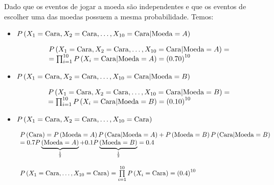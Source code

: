 \item

Dado que os eventos de jogar a moeda são independentes e que os eventos de
escolher uma das moedas possuem a mesma probabilidade. Temos:

\begin{itemize}

  \item $P\left( {{X_1} = {\rm{Cara}},{X_2} = {\rm{Cara}}, \ldots ,{X_{10}} = {\rm{Cara}}|{\rm{Moeda}} = A} \right)$

  \[\begin{array}{l}
  P\left( {{X_1} = {\rm{Cara}},{X_2} = {\rm{Cara}}, \ldots ,{X_{10}} = {\rm{Cara}}|{\rm{Moeda}} = A} \right) = \\
   = \prod\nolimits_{i = 1}^{10} {P\left( {{X_i} = {\rm{Cara}}|{\rm{Moeda}} = A} \right)}  = {\left( {0.70} \right)^{10}}
  \end{array}\]

  \item $P\left( {{X_1} = {\rm{Cara}},{X_2} = {\rm{Cara}}, \ldots ,{X_{10}} = {\rm{Cara}}|{\rm{Moeda}} = B} \right)$

  \[\begin{array}{l}
  P\left( {{X_1} = {\rm{Cara}},{X_2} = {\rm{Cara}}, \ldots ,{X_{10}} = {\rm{Cara}}|{\rm{Moeda}} = B} \right) = \\
   = \prod\nolimits_{i = 1}^{10} {P\left( {{X_i} = {\rm{Cara}}|{\rm{Moeda}} = B} \right)}  = {\left( {0.10} \right)^{10}}
  \end{array}\]

  \item $P\left( {{X_1} = {\rm{Cara}},{X_2} = {\rm{Cara}}, \ldots ,{X_{10}} = {\rm{Cara}}} \right)$

  \[\begin{array}{l}
  P\left( {{\rm{Cara}}} \right) = P\left( {{\rm{Moeda}} = A} \right)P\left( {{\rm{Cara}}|{\rm{Moeda}} = A} \right) + P\left( {{\rm{Moeda}} = B} \right)P\left( {{\rm{Cara}}|{\rm{Moeda}} = B} \right)\\
   = 0.7P\underbrace {\left( {{\rm{Moeda}} = A} \right)}_{\frac{1}{2}} + 0.1P\underbrace {\left( {{\rm{Moeda}} = B} \right)}_{\frac{1}{2}} = 0.4\\
  \\
  P\left( {{X_1} = {\rm{Cara}}, \ldots ,{X_{10}} = {\rm{Cara}}} \right) = \prod\limits_{i = 1}^{10} {P\left( {{X_i} = {\rm{Cara}}} \right) = {{\left( {0.4} \right)}^{10}}}
  \end{array}\]


\end{itemize}
